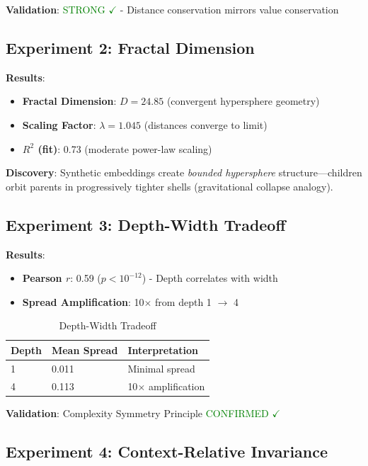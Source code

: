\documentclass[11pt,a4paper]{article}
\begin{document}
\textbf{Validation}: \textcolor{green}{STRONG $\checkmark$} - Distance conservation mirrors value conservation

\subsection{Experiment 2: Fractal Dimension}

\textbf{Results}:
\begin{itemize}
    \item \textbf{Fractal Dimension}: $D = 24.85$ (convergent hypersphere geometry)
    \item \textbf{Scaling Factor}: $\lambda = 1.045$ (distances converge to limit)
    \item \textbf{$R^2$ (fit)}: 0.73 (moderate power-law scaling)
\end{itemize}

\textbf{Discovery}: Synthetic embeddings create \emph{bounded hypersphere} structure---children orbit parents in progressively tighter shells (gravitational collapse analogy).

\subsection{Experiment 3: Depth-Width Tradeoff}

\textbf{Results}:
\begin{itemize}
    \item \textbf{Pearson $r$}: 0.59 ($p < 10^{-12}$) - Depth correlates with width
    \item \textbf{Spread Amplification}: 10$\times$ from depth 1 $\to$ 4
\end{itemize}

\begin{table}[h]
\centering
\begin{tabular}{lll}
\toprule
\textbf{Depth} & \textbf{Mean Spread} & \textbf{Interpretation} \\
\midrule
1 & 0.011 & Minimal spread \\
4 & 0.113 & 10$\times$ amplification \\
\bottomrule
\end{tabular}
\caption{Depth-Width Tradeoff}
\end{table}

\textbf{Validation}: Complexity Symmetry Principle \textcolor{green}{CONFIRMED $\checkmark$}

\subsection{Experiment 4: Context-Relative Invariance}
\end{document}
